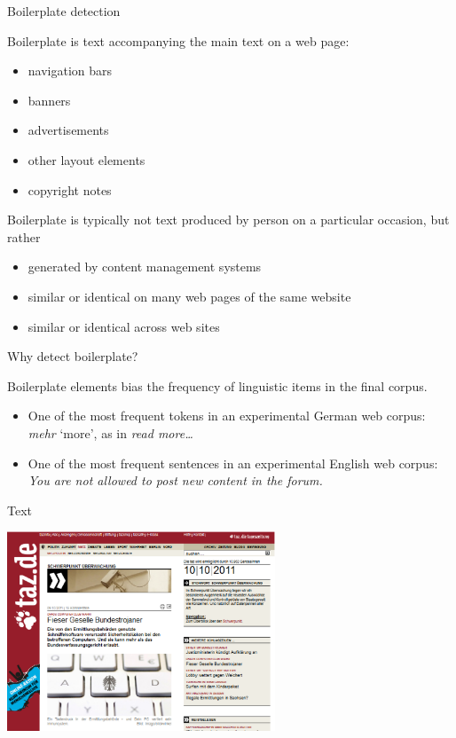 \begin{frame}
  {Boilerplate detection}

Boilerplate is text accompanying the main text on a web page:

\begin{itemize}
\item navigation bars
\item banners
\item advertisements
\item other layout elements 
\item copyright notes
\end{itemize}

\pause

Boilerplate is typically not text produced by person on a particular occasion, but rather

\begin{itemize}
\item generated by content management systems
\item similar or identical on many web pages of the same website
\item similar or identical across web sites 
\end{itemize}
\end{frame}


\begin{frame}
  {Why detect boilerplate?}

Boilerplate elements bias the frequency of linguistic items in the final corpus.

\begin{itemize}
\item One of the most frequent tokens in an experimental German web corpus: \textit{mehr} `more', as in \textit{read more\ldots}\\[1ex] \pause
\item One of the most frequent sentences in an experimental English web corpus: \textit{You are not allowed to post new content in the forum.}
\end{itemize}
\end{frame}


\begin{frame}
  {Text}
  \begin{center}
    \includegraphics[width=8cm]{graphicswcc/webseite}
  \end{center}
\end{frame}

